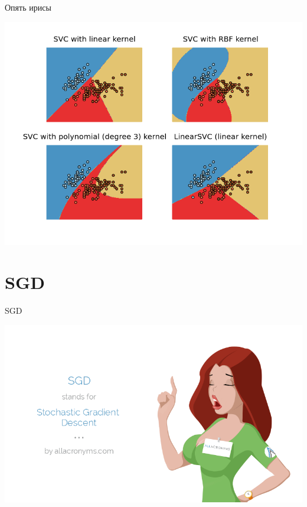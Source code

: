 \documentclass[aspectratio=169]{beamer}
\begin{document}
\begin{frame}{Опять ирисы}

\begin{center}
\includegraphics[scale=0.5]{images/iris.png}
\end{center}

\end{frame}


\section{SGD}


\begin{frame}{}

\begin{center}
\Large SGD

\vspace{1em}
\includegraphics[height=0.8\textheight]{images/acro.png}
\end{center}

\end{frame}
\end{document}
